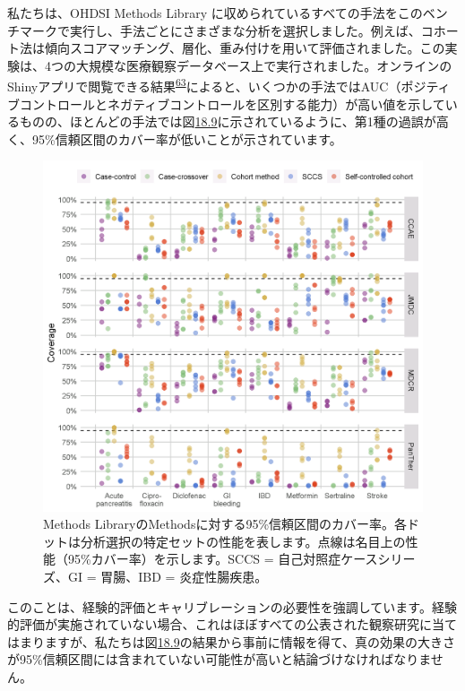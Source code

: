 \documentclass[
  11pt]{book}
\theoremstyle{definition}
\theoremstyle{definition}
\theoremstyle{definition}
\theoremstyle{definition}
\theoremstyle{remark}
\begin{document}
私たちは、OHDSI Methods Library に収められているすべての手法をこのベンチマークで実行し、手法ごとにさまざまな分析を選択しました。例えば、コホート法は傾向スコアマッチング、層化、重み付けを用いて評価されました。この実験は、4つの大規模な医療観察データベース上で実行されました。オンラインのShinyアプリで閲覧できる結果\textsuperscript{\href{https://ohdsi.github.io/TheBookOfOhdsi/MethodValidity.html\#fn63}{63}}によると、いくつかの手法ではAUC（ポジティブコントロールとネガティブコントロールを区別する能力）が高い値を示しているものの、ほとんどの手法では図\href{https://ohdsi.github.io/TheBookOfOhdsi/MethodValidity.html\#fig:methodEval}{18.9}に示されているように、第1種の過誤が高く、95\%信頼区間のカバー率が低いことが示されています。

\begin{figure}[h]

{\centering \includegraphics[width=1\linewidth]{images/MethodValidity/methodEval} 

}

\caption{Methods LibraryのMethodsに対する95\%信頼区間のカバー率。各ドットは分析選択の特定セットの性能を表します。点線は名目上の性能（95\%カバー率）を示します。SCCS = 自己対照症ケースシリーズ、GI = 胃腸、IBD = 炎症性腸疾患。}\label{fig:methodEval}
\end{figure}

このことは、経験的評価とキャリブレーションの必要性を強調しています。経験的評価が実施されていない場合、これはほぼすべての公表された観察研究に当てはまりますが、私たちは図\href{https://ohdsi.github.io/TheBookOfOhdsi/MethodValidity.html\#fig:methodEval}{18.9}の結果から事前に情報を得て、真の効果の大きさが95\%信頼区間には含まれていない可能性が高いと結論づけなければなりません。
\end{document}
